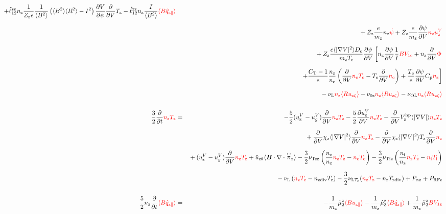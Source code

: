 \documentclass[11pt]{article}
\def\bvec#1{\leavevmode\hbox{\boldmath$#1$}}
\let\vec=\bvec
\def\r#1{{\rm#1}}
\def\aves#1{\langle#1\rangle}
\def\dd#1#2{\frac{\partial #1}{\partial #2}}
\def\tensor#1{\mathord{\displaystyle\mathop{#1}^\leftrightarrow}}
\def\para{\parallel}
\def\ddV{\frac{\partial}{\partial V}}
\def\ddt{\frac{\partial}{\partial t}}
\def\mz{m_\r{z}}
\def\nee{n_\r{e}}
\def\ni{n_\r{i}}
\def\nz{n_\r{z}}
\def\Te{T_\r{e}}
\def\Ti{T_\r{i}}
\def\Tz{T_\r{z}}
\def\Zz{Z_\r{z}}
\def\uzt#1{u_{\r{#1}\zeta}}
\def\upara#1{u_{\r{#1}\para}}
\def\uhatth#1{\hat{u}_{\r{#1}\theta}}
\def\qhatpara#1{\hat{q}_{\r{#1}\para}}
\def\uV#1{u_\r{#1}^V}
\def\ugV{u_{g}^V}
\def\chis#1{\chi_\r{#1}}
\def\De{D_\r{e}}
\def\nun#1{\nu_\r{0#1}}
\def\ndiv#1{n_\r{#1div}}
\def\Tdiv#1{T_\r{#1div}}
\def\nuLT#1{\nu_{\r{L}T_\r{#1}}}
\def\PRF#1{P_\r{RF#1}}
\def\Palp#1{P_{\alpha\r{#1}}}
\def\bri{\aves{B^2}\aves{R^2} - I^2}
\def\nuL{\nu_\r{L}}
\def\nuOL{\nu_\r{OL}}
\def\red#1{\textcolor{red}{#1}}
\begin{document}
\begin{eqnarray}
  + \hat{\ell}_{12}^\r{zz} \nz \frac{1}{\Zz e} \frac{1}{\aves{B^2}} \left( \bri \right)
    \dd{V}{\psi} \ddV \Tz
  - \hat{\ell}_{12}^\r{zz} \nz \frac{I}{\aves{B^2}} \red{\aves{B \qhatpara{z}}}
\nonumber\\[2.5mm]&&{}
%
  + \Zz \frac{e}{\mz}              \nz \red{\dot{\psi}}
%
  + \Zz \frac{e}{\mz} \dd{\psi}{V} \red{\nz \uV{z}}
%
\nonumber\\[2.5mm]&&{}
%
%
  + \Zz \frac{e \aves{|\nabla V|^2} \De}{\mz\Te} \dd{\psi}{V} 
  \left[   \nz \dd{\psi}{V} \frac{1}{I} \red{B V_{1\r{e}}}
         + \nz \ddV \red{\Phi} \right.
\nonumber\\[2.5mm]&&{}
  \left. + \frac{C_\r{T}-1}{e} \frac{\nz}{\nee}
           \left( \ddV \red{\nee \Te} - \Te \ddV \red{\nee} \right)
         + \frac{\Te}{e} \dd{\psi}{V} C_\r{p} \red{\nz} \right]
\nonumber\\[2.5mm]&&{}
%
  - \nuL  \red{\nz \aves{R \uzt{z}}}
%
  - \nun{z} \red{\nz \aves{R \uzt{z}}}
%
  - \nuOL \red{\nz \aves{R \uzt{z}}}
\\[5mm]
  \frac{3}{2} \ddt \red{\nz \Tz}  &=& 
%
  - \frac{5}{2} ( \uV{z} - \ugV ) \ddV \red{\nz \Tz}
%
  - \frac{5}{2} \dd{\uV{z}}{V} \red{\nz \Tz}
%
  - \ddV V_\r{z}^\r{hp} \aves{|\nabla V|} \red{\nz \Tz}
\nonumber\\[2.5mm]&&{}
  + \ddV \chis{z} \aves{|\nabla V|^2} \ddV \red{\nz \Tz}
  - \ddV \chis{z} \aves{|\nabla V|^2} \Tz \ddV \red{\nz}
\nonumber\\[2.5mm]&&{}
%
  + ( \uV{z} - \ugV ) \ddV \red{\nz \Tz}
%
  + \uhatth{z} \aves{\vec{B}\cdot\nabla\cdot\tensor{\pi}_\r{z}}
%
  - \frac{3}{2} \nu_\r{Tez} \left(\frac{\nee}{\nz} \red{\nz \Tz} - \red{\nee \Te} \right)
  - \frac{3}{2} \nu_\r{Tiz} \left(\frac{\ni }{\nz} \red{\nz \Tz} - \red{\ni  \Ti} \right)
\nonumber\\[2.5mm]&&{}
%
  - \nuL \left(\red{\nz \Tz}  - \ndiv{z} \Tz \right)
%
  - \frac{3}{2} \nuLT{z} (\red{\nz \Tz} - \nz \Tdiv{z})
%
  + \Palp{z}
%
  + \PRF{z}
\\[5mm]
 \frac{5}{2} \nz \ddt \red{\aves{B \qhatpara{z}}} &=&
%
  - \frac{1}{\mz} \hat{\mu}_2^\r{z} \red{\aves{B \upara{z}}}
  - \frac{1}{\mz} \hat{\mu}_3^\r{z} \red{\aves{B \qhatpara{z}}}
%
  + \frac{1}{\mz} \hat{\mu}_2^\r{z} \red{B V_{1\r{z}}}

\end{eqnarray}
\end{document}
